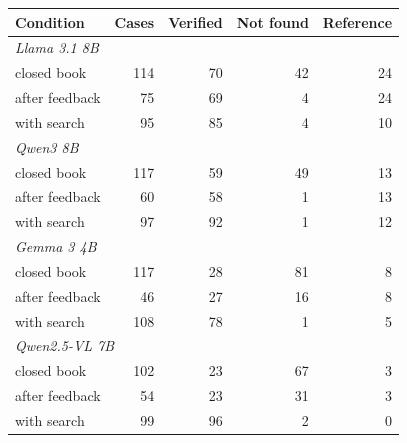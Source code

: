\begin{tabular}{lrrrr}
\toprule
Condition & Cases & Verified & Not found & Reference \\
\midrule
\multicolumn{5}{l}{\textit{Llama 3.1 8B}} \\
\quad closed book & 114 & 70 & 42 & 24 \\
\quad after feedback & 75 & 69 & 4 & 24 \\
\quad with search & 95 & 85 & 4 & 10 \\
\multicolumn{5}{l}{\textit{Qwen3 8B}} \\
\quad closed book & 117 & 59 & 49 & 13 \\
\quad after feedback & 60 & 58 & 1 & 13 \\
\quad with search & 97 & 92 & 1 & 12 \\
\multicolumn{5}{l}{\textit{Gemma 3 4B}} \\
\quad closed book & 117 & 28 & 81 & 8 \\
\quad after feedback & 46 & 27 & 16 & 8 \\
\quad with search & 108 & 78 & 1 & 5 \\
\multicolumn{5}{l}{\textit{Qwen2.5-VL 7B}} \\
\quad closed book & 102 & 23 & 67 & 3 \\
\quad after feedback & 54 & 23 & 31 & 3 \\
\quad with search & 99 & 96 & 2 & 0 \\
\bottomrule
\end{tabular}
